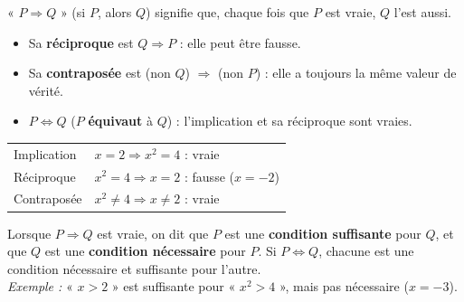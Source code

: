 
\noindent
\begin{minipage}[c]{0.55\linewidth}
\begin{definition}
\raggedright
« $P\Rightarrow Q$ » (si $P$, alors $Q$) signifie que, chaque fois que $P$ est vraie, $Q$ l'est aussi.
\begin{itemize}[leftmargin=1.2em,itemsep=0.4mm,topsep=0.6mm]
  \item Sa \textbf{réciproque} est $Q\Rightarrow P$ : elle peut être fausse.
  \item Sa \textbf{contraposée} est (non $Q$) $\Rightarrow$ (non $P$) : elle a toujours la même valeur de vérité.
  \item $P\iff Q$ ($P$ \textbf{équivaut} à $Q$) : l'implication et sa réciproque sont vraies.
\end{itemize}
\end{definition}
\end{minipage}\hfill
\begin{minipage}[c]{0.41\linewidth}
\centering
{\renewcommand{\arraystretch}{1.5}%
\begin{tabularx}{\linewidth}{@{}>{\leavevmode\color{otNavy}\otSemi\fontsize{7.5}{10}\selectfont}l@{\hspace{2.5mm}}Y@{}}
\toprule
{} \\
\midrule
Implication & $x=2\Rightarrow x^{2}=4$ : vraie \\
Réciproque & $x^{2}=4\Rightarrow x=2$ : fausse ($x=-2$) \\
Contraposée & $x^{2}\neq4\Rightarrow x\neq2$ : vraie \\
\bottomrule
\end{tabularx}}
\end{minipage}

\begin{definition}
Lorsque $P\Rightarrow Q$ est vraie, on dit que $P$ est une \textbf{condition suffisante} pour $Q$, et que $Q$ est une
\textbf{condition nécessaire} pour $P$. Si $P\iff Q$, chacune est une condition nécessaire et suffisante pour l'autre.\\[1mm]
\emph{Exemple :} « $x>2$ » est suffisante pour « $x^{2}>4$ », mais pas nécessaire ($x=-3$).
\end{definition}


